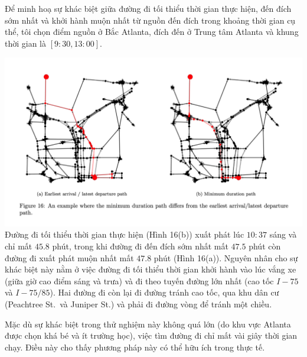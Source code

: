 \documentclass[../main.tex]{subfiles}
\begin{document}
Để minh hoạ sự khác biệt giữa đường đi tối thiểu thời gian thực hiện,
đến đích sớm nhất và khởi hành muộn nhất từ nguồn đến đích trong khoảng
thời gian cụ thể, tôi chọn điểm nguồn ở Bắc Atlanta, đích đến ở Trung
tâm Atlanta và khung thời gian là \([9:30, 13:00]\).

\includegraphics{images/Figure16.png} Đường đi tối thiểu thời gian thực
hiện (Hình 16(b)) xuất phát lúc \(10:37\) sáng và chỉ mất \(45.8\) phút,
trong khi đường đi đến đích sớm nhất mất \(47.5\) phút còn đường đi xuất
phát muộn nhất mất \(47.8\) phút (Hình 16(a)). Nguyên nhân cho sự khác
biệt này nằm ở việc đường đi tối thiểu thời gian khởi hành vào lúc vắng
xe (giữa giờ cao điểm sáng và trưa) và đi theo tuyến đường lớn nhất (cao
tốc \(I-75\) và \(I-75/85\)). Hai đường đi còn lại đi đường tránh cao
tốc, qua khu dân cư (Peachtree St.~và Juniper St.) và phải đi đường vòng
để tránh một chiều.

Mặc dù sự khác biệt trong thử nghiệm này không quá lớn (do khu vực
Atlanta được chọn khá bé và ít trường học), việc tìm đường đi chỉ mất
vài giây thời gian chạy. Điều này cho thấy phương pháp này có thể hữu
ích trong thực tế.
\backmatter
\end{document}
